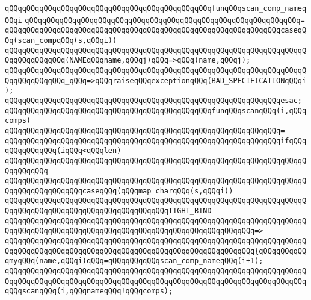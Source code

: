 \newline
\verb|qQQqqQQqqQQqqQQqqQQqqQQqqQQqqQQqqQQqqQQqqQQqqQQqfunqQQqscan_comp_nameqQQqi|\newline
\verb|qQQqqQQqqQQqqQQqqQQqqQQqqQQqqQQqqQQqqQQqqQQqqQQqqQQqqQQqqQQqqQQq=|\newline
\verb|qQQqqQQqqQQqqQQqqQQqqQQqqQQqqQQqqQQqqQQqqQQqqQQqqQQqqQQqqQQqqQQqcaseqQQq(scan_compqQQq(s,qQQqi))|\newline
\verb|qQQqqQQqqQQqqQQqqQQqqQQqqQQqqQQqqQQqqQQqqQQqqQQqqQQqqQQqqQQqqQQqqQQqqQQqqQQqqQQqqQQq(NAMEqQQqname,qQQqj)qQQq=>qQQq(name,qQQqj);|\newline
\verb|qQQqqQQqqQQqqQQqqQQqqQQqqQQqqQQqqQQqqQQqqQQqqQQqqQQqqQQqqQQqqQQqqQQqqQQqqQQqqQQqqQQq_qQQq=>qQQqraiseqQQqexceptionqQQq(BAD_SPECIFICATIONqQQqi);|\newline
\verb|qQQqqQQqqQQqqQQqqQQqqQQqqQQqqQQqqQQqqQQqqQQqqQQqqQQqqQQqqQQqqQQqesac;|\newline
\newline
\newline
\verb|qQQqqQQqqQQqqQQqqQQqqQQqqQQqqQQqqQQqqQQqqQQqqQQqfunqQQqscanqQQq(i,qQQqcomps)|\newline
\verb|qQQqqQQqqQQqqQQqqQQqqQQqqQQqqQQqqQQqqQQqqQQqqQQqqQQqqQQqqQQqqQQq=|\newline
\verb|qQQqqQQqqQQqqQQqqQQqqQQqqQQqqQQqqQQqqQQqqQQqqQQqqQQqqQQqqQQqqQQqifqQQqqQQqqQQqqQQq(iqQQq<qQQqlen)|\newline
\verb|qQQqqQQqqQQqqQQqqQQqqQQqqQQqqQQqqQQqqQQqqQQqqQQqqQQqqQQqqQQqqQQqqQQqqQQqqQQqqQQq|\newline
\verb|qQQqqQQqqQQqqQQqqQQqqQQqqQQqqQQqqQQqqQQqqQQqqQQqqQQqqQQqqQQqqQQqqQQqqQQqqQQqqQQqqQQqqQQqcaseqQQq(qQQqmap_charqQQq(s,qQQqi))|\newline
\newline
\verb|qQQqqQQqqQQqqQQqqQQqqQQqqQQqqQQqqQQqqQQqqQQqqQQqqQQqqQQqqQQqqQQqqQQqqQQqqQQqqQQqqQQqqQQqqQQqqQQqqQQqqQQqqQQqTIGHT_BIND|\newline
\verb|qQQqqQQqqQQqqQQqqQQqqQQqqQQqqQQqqQQqqQQqqQQqqQQqqQQqqQQqqQQqqQQqqQQqqQQqqQQqqQQqqQQqqQQqqQQqqQQqqQQqqQQqqQQqqQQqqQQqqQQqqQQqqQQq=>|\newline
\verb|qQQqqQQqqQQqqQQqqQQqqQQqqQQqqQQqqQQqqQQqqQQqqQQqqQQqqQQqqQQqqQQqqQQqqQQqqQQqqQQqqQQqqQQqqQQqqQQqqQQqqQQqqQQqqQQqqQQqqQQqqQQqqQQq{qQQqqQQqqQQqmyqQQq(name,qQQqi)qQQq=qQQqqQQqqQQqscan_comp_nameqQQq(i+1);|\newline
\newline
\verb|qQQqqQQqqQQqqQQqqQQqqQQqqQQqqQQqqQQqqQQqqQQqqQQqqQQqqQQqqQQqqQQqqQQqqQQqqQQqqQQqqQQqqQQqqQQqqQQqqQQqqQQqqQQqqQQqqQQqqQQqqQQqqQQqqQQqqQQqqQQqqQQqscanqQQq(i,qQQqnameqQQq!qQQqcomps);|\newline
